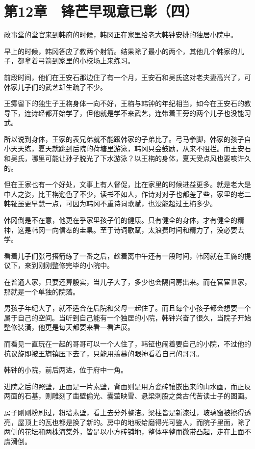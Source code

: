 \section{第12章　锋芒早现意已彰（四）}

政事堂的堂官来到韩府的时候，韩冈正在家里给老大韩钟安排的独居小院中。

早上的时候，韩冈答应了教两个射箭。结果除了最小的两个，其他几个韩家的儿子，都拿着弓箭到家里的小校场上来练习。

前段时间，他们在王安石那边住了有一个月，王安石和吴氏这对老夫妻高兴了，可韩家儿子们的武艺却生疏了不少。

王雱留下的独生子王栴身体一向不好，王栴与韩钟的年纪相当，如今在王安石的教导下，连诗经都开始学了，但他就是学不来武艺，连带着王旁的两个儿子也没能习武。

所以说到身体，王家的表兄弟就不能跟韩家的子弟比了。弓马拳脚，韩家的孩子自小天天练，夏天就跳到后院的荷塘里游泳，韩冈只会鼓励，从来不阻拦。而王安石和吴氏，哪里可能让孙子脱光了下水游泳？以王栴的身体，夏天受点风也要咳许久的。

但在王家也有一个好处，文事上有人督促，比在家里的时候进益更多。就是老大是中人之姿，比王栴逊色了不少，读书不如人，作诗对对子也都差了些，家里的老二韩钲虽更早慧一点，可因为韩冈不重诗词歌赋，也没能超过王栴多少。

韩冈倒是不在意，他更在乎家里孩子们的健康。只有健全的身体，才有健全的精神，这是韩冈一向信奉的圭臬。至于诗词歌赋，太浪费时间和精力了，没必要去学。

看着儿子们张弓搭箭练了一番之后，趁着离中午还有一段时间，韩冈就在王旖的提议下，来到刚刚整修完毕的小院中。

在普通人家，只要还算殷实，当儿子大了，多少也会隔间房出来。而在官宦世家，那就是一个单独的院落。

男孩子年纪大了，就不适合在后院和父母一起住了。而且每个小孩子都会想要一个属于自己的空间。当听到自己能有一个独居的小院，韩钟兴奋了很久，当院子开始整修装潢，他更是每天都要来看一看进展。

而看见一直玩在一起的哥哥可以一个人住了，韩钲也闹着要自己的小院，不过他的抗议旋即被王旖镇压下去了，只能用羡慕的眼神看着自己的哥哥。

韩钟的小院，前后两进，位于府中一角。

进院之后的照壁，正面是一片素壁，背面则是用方瓷砖镶嵌出来的山水画，而正反两面的石基，则雕刻了凿壁偷光、囊萤映雪、悬梁刺股之类古代苦读士子的图画。

房子刚刚粉刷过，粉墙素壁，看上去分外整洁。梁柱皆是新漆过，玻璃窗被擦得透亮，屋顶上的瓦也都是换了新的。房中的地板给磨得光可鉴人，而院子里面，除了两侧的花坛和两株海棠外，皆是以小方砖铺地，整体平整而微带凸起，走在上面不虞滑倒。


